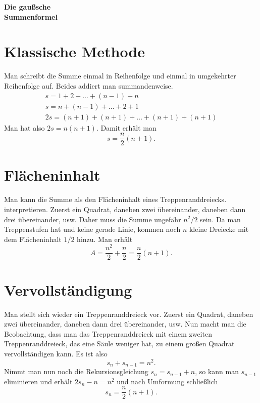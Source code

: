 \documentclass[a4paper,10pt,fleqn,twocolumn,twoside]{article}
\begin{document}
\thispagestyle{empty}

\begin{huge}
\noindent
\textbf{Die gaußsche\\
Summenformel}
\par
\end{huge}


\section{Klassische Methode}

Man schreibt die Summe einmal in Reihenfolge und einmal in
umgekehrter Reihenfolge auf. Beides addiert man summandenweise.
\begin{gather*}
s = 1+2+\ldots+(n-1)+n\\
s = n+(n-1)+\ldots+2+1\\
2s = (n+1)+(n+1)+\ldots+(n+1)+(n+1)
\end{gather*}
Man hat also \(2s=n(n+1)\). Damit erhält man
\[s = \frac{n}{2}(n+1).\]


\section{Flächeninhalt}

Man kann die Summe als den Flächeninhalt eines Treppenranddreiecks.
interpretieren. Zuerst ein Quadrat, daneben zwei übereinander,
daneben dann drei übereinander, usw.
Daher muss die Summe ungefähr \(n^2/2\) sein. Da man Treppenstufen
hat und keine gerade Linie, kommen noch \(n\) kleine Dreiecke mit
dem Flächeninhalt \(1/2\) hinzu. Man erhält
\[A = \frac{n^2}{2}+\frac{n}{2} = \frac{n}{2}(n+1).\]


\section{Vervollständigung}

Man stellt sich wieder ein Treppenranddreieck vor.
Zuerst ein Quadrat, daneben zwei übereinander, daneben dann drei übereinander, usw.
Nun macht man die Beobachtung, dass man das Treppenranddreieck mit
einem zweiten Treppenranddreieck, das eine Säule weniger hat,
zu einem großen Quadrat vervollständigen kann. Es ist also
\[s_n+s_{n-1} = n^2.\]
Nimmt man nun noch die Rekursionsgleichung \(s_{n}=s_{n-1}+n\),
so kann man \(s_{n-1}\) eliminieren und erhält \(2s_n-n = n^2\)
und nach Umformung schließlich
\[s_n = \frac{n}{2}(n+1).\]
\end{document}
